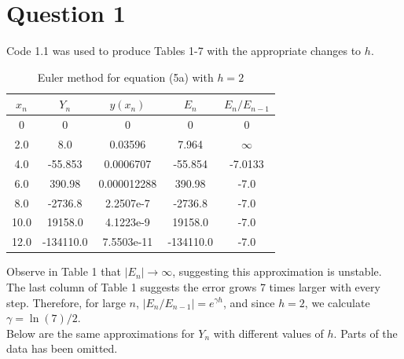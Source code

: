 \documentclass[10pt,a4paper,notitlepage]{article}
\newcommand{\abs}[1]{\lvert#1\rvert}
\begin{document}
\section*{\centering \large Question 1}
Code 1.1 was used to produce Tables 1-7 with the appropriate changes to $h$. 
\begin{table}[H]
\begin{center}
\begin{tabular}{|c|c|c|c|c|} 
\hline
$x_{n}$&$Y_{n}$&$y(x_{n})$&$E_{n}$&$E_{n}/E_{n-1}$\\ \hline
0 & 0 & 0 & 0 & 0\\  2.0 & 8.0 & 0.03596 & 7.964 & $\infty$ \\  4.0 & -55.853 & 0.0006707 & -55.854 & -7.0133\\ 6.0 & 390.98 & 0.000012288 & 390.98 & -7.0\\ 8.0 & -2736.8 & 2.2507e-7 & -2736.8 & -7.0\\ 10.0 & 19158.0 & 4.1223e-9 & 19158.0 & -7.0\\ 12.0 & -134110.0 & 7.5503e-11 & -134110.0 & -7.0\\ \hline
\end{tabular}
\caption{Euler method for equation (5a) with $h=2$}
\end{center}
\end{table}
Observe in Table 1 that $\abs{E_{n}}\rightarrow \infty$, suggesting this approximation is unstable. The last column of Table 1 suggests the error grows 7 times larger with every step.  Therefore, for large $n$,  $\abs{E_{n}/E_{n-1}}=e^{\gamma h}$, and since $h=2$, we calculate $\gamma=\ln(7)/2$.\\

Below are the same approximations for $Y_{n}$ with different values of $h$. Parts of the data has been omitted. 
\end{document}
